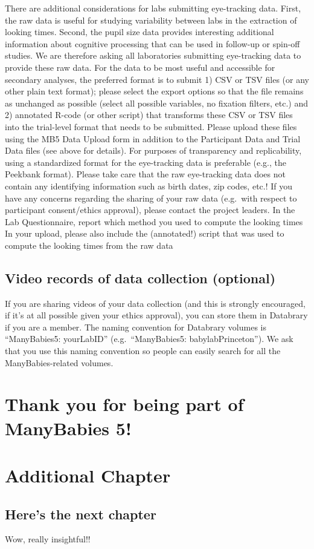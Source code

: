 \documentclass[
]{book}
\begin{document}
There are additional considerations for labs submitting eye-tracking data. First, the raw data is useful for studying variability between labs in the extraction of looking times. Second, the pupil size data provides interesting additional information about cognitive processing that can be used in follow-up or spin-off studies. We are therefore asking all laboratories submitting eye-tracking data to provide these raw data. For the data to be most useful and accessible for secondary analyses, the preferred format is to submit 1) CSV or TSV files (or any other plain text format); please select the export options so that the file remains as unchanged as possible (select all possible variables, no fixation filters, etc.) and 2) annotated R-code (or other script) that transforms these CSV or TSV files into the trial-level format that needs to be submitted.
Please upload these files using the MB5 Data Upload form in addition to the Participant Data and Trial Data files (see above for details). For purposes of transparency and replicability, using a standardized format for the eye-tracking data is preferable (e.g., the Peekbank format). Please take care that the raw eye-tracking data does not contain any identifying information such as birth dates, zip codes, etc.! If you have any concerns regarding the sharing of your raw data (e.g.~with respect to participant consent/ethics approval), please contact the project leaders.
In the Lab Questionnaire, report which method you used to compute the looking times
In your upload, please also include the (annotated!) script that was used to compute the looking times from the raw data

\section{Video records of data collection (optional)}\label{video-records-of-data-collection-optional}

If you are sharing videos of your data collection (and this is strongly encouraged, if it's at all possible given your ethics approval), you can store them in Databrary if you are a member. The naming convention for Databrary volumes is ``ManyBabies5: yourLabID'' (e.g.~``ManyBabies5: babylabPrinceton''). We ask that you use this naming convention so people can easily search for all the ManyBabies-related volumes.

\chapter*{Thank you for being part of ManyBabies 5!}\label{thank-you-for-being-part-of-manybabies-5}

\chapter{Additional Chapter}\label{additional-chapter}

\section{Here's the next chapter}\label{heres-the-next-chapter}

Wow, really insightful!!

  
\end{document}

